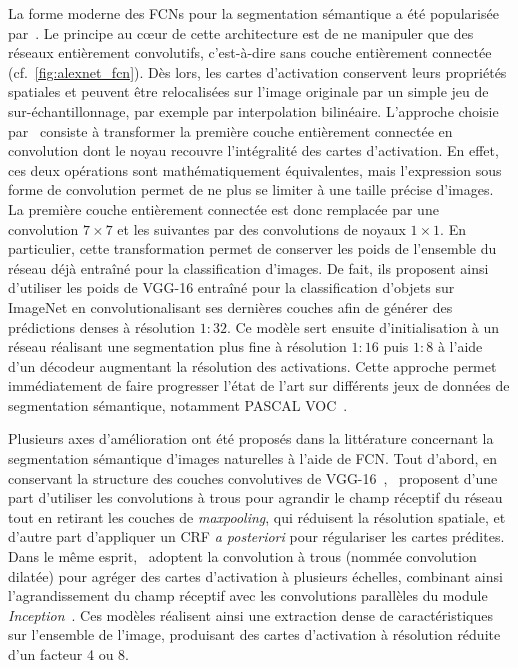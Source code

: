 La forme moderne des \glspl{FCN} pour la segmentation sémantique a été popularisée par~\citet{long_fully_2015}. Le principe au c\oe{}ur de cette architecture est de ne manipuler que des réseaux entièrement convolutifs, c'est-à-dire sans couche entièrement connectée (cf.~\cref{fig:alexnet_fcn}). Dès lors, les cartes d'activation conservent leurs propriétés spatiales et peuvent être relocalisées sur l'image originale par un simple jeu de sur-échantillonnage, par exemple par interpolation bilinéaire. L'approche choisie par~\citet{long_fully_2015} consiste à transformer la première couche entièrement connectée en convolution dont le noyau recouvre l'intégralité des cartes d'activation. En effet, ces deux opérations sont mathématiquement équivalentes, mais l'expression sous forme de convolution permet de ne plus se limiter à une taille précise d'images. La première couche entièrement connectée est donc remplacée par une convolution $7\times7$ et les suivantes par des convolutions de noyaux $1\times1$. En particulier, cette transformation permet de conserver les poids de l'ensemble du réseau déjà entraîné pour la classification d'images. De fait, ils proposent ainsi d'utiliser les poids de VGG-16 entraîné pour la classification d'objets sur ImageNet en convolutionalisant ses dernières couches afin de générer des prédictions denses à résolution $1:32$. Ce modèle sert ensuite d'initialisation à un réseau réalisant une segmentation plus fine à résolution $1:16$ puis $1:8$ à l'aide d'un décodeur augmentant la résolution des activations. Cette approche permet immédiatement de faire progresser l'état de l'art sur différents jeux de données de segmentation sémantique, notamment PASCAL VOC~\cite{everingham_pascal_2014}.

Plusieurs axes d'amélioration ont été proposés dans la littérature concernant la segmentation sémantique d'images naturelles à l'aide de \gls{FCN}. Tout d'abord, en conservant la structure des couches convolutives de VGG-16~\cite{simonyan_very_2014},~\citet{chen_deeplab_2018} proposent d'une part d'utiliser les convolutions à trous pour agrandir le champ réceptif du réseau tout en retirant les couches de \emph{maxpooling}, qui réduisent la résolution spatiale, et d'autre part d'appliquer un \gls{CRF} \emph{a posteriori} pour régulariser les cartes prédites. Dans le même esprit,~\citet{yu_multi-scale_2015} adoptent la convolution à trous (nommée convolution dilatée) pour agréger des cartes d'activation à plusieurs échelles, combinant ainsi l'agrandissement du champ réceptif avec les convolutions parallèles du module \emph{Inception}~\cite{szegedy_going_2015}. Ces modèles réalisent ainsi une extraction dense de caractéristiques sur l'ensemble de l'image, produisant des cartes d'activation à résolution réduite d'un facteur 4 ou 8.

